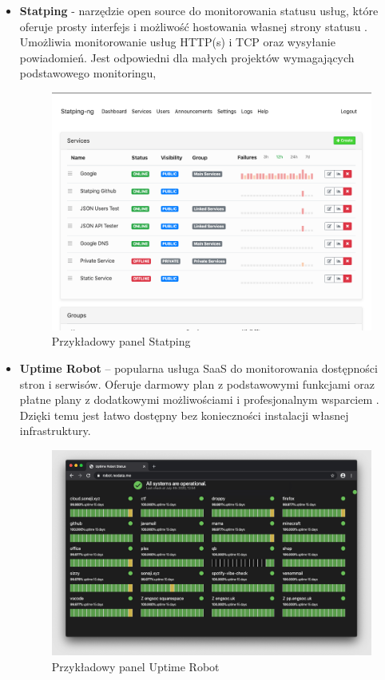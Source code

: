\documentclass{article}
\begin{document}
\begin{itemize}
    \item \textbf{Statping} - narzędzie open source do monitorowania statusu usług, które oferuje prosty interfejs i możliwość hostowania własnej strony statusu \cite{StatpingGithub}. Umożliwia monitorowanie usług HTTP(s) i TCP oraz wysyłanie powiadomień. Jest odpowiedni dla małych projektów wymagających podstawowego monitoringu,

\begin{figure}[H]
    \centering
    \includegraphics[width=0.5\linewidth]{przykladStatping.png}
    \caption{Przykładowy panel Statping}
    \label{fig:enter-label}
\end{figure}
    
    \item \textbf{Uptime Robot} – popularna usługa SaaS do monitorowania dostępności stron i serwisów. Oferuje darmowy plan z podstawowymi funkcjami oraz płatne plany z dodatkowymi możliwościami i profesjonalnym wsparciem \cite{UptimeRobotMedium}. Dzięki temu jest łatwo dostępny bez konieczności instalacji własnej infrastruktury.

\begin{figure}[H]
    \centering
    \includegraphics[width=0.5\linewidth]{przykladUptimeRobot.png}
    \caption{Przykładowy panel Uptime Robot}
    \label{fig:enter-label}
\end{figure}
\end{itemize}
\end{document}

